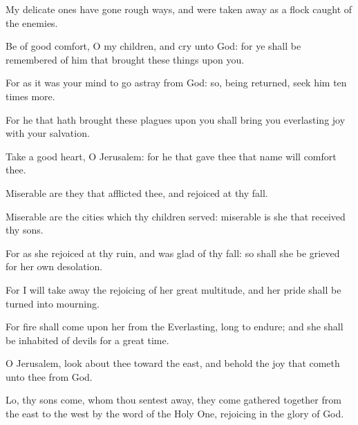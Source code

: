 {\par }{\PP {}My delicate ones have gone rough ways, and were taken away as a flock caught of the enemies.
\par }{\PP {}Be of good comfort, O my children, and cry unto God: for ye shall be remembered of him that brought these things upon you.
\par }{\PP {}For as it was your mind to go astray from God: so, being returned, seek him ten times more.
\par }{\PP {}For he that hath brought these plagues upon you shall bring you everlasting joy with your salvation.
\par }{\PP {}Take a good heart, O Jerusalem: for he that gave thee that name will comfort thee.
\par }{\PP {}Miserable are they that afflicted thee, and rejoiced at thy fall.
\par }{\PP {}Miserable are the cities which thy children served: miserable is she that received thy sons.
\par }{\PP {}For as she rejoiced at thy ruin, and was glad of thy fall: so shall she be grieved for her own desolation.
\par }{\PP {}For I will take away the rejoicing of her great multitude, and her pride shall be turned into mourning.
\par }{\PP {}For fire shall come upon her from the Everlasting, long to endure; and she shall be inhabited of devils for a great time.
\par }{\PP {}O Jerusalem, look about thee toward the east, and behold the joy that cometh unto thee from God.
\par }{\PP {}Lo, thy sons come, whom thou sentest away, they come gathered together from the east to the west by the word of the Holy One, rejoicing in the glory of God.

}
